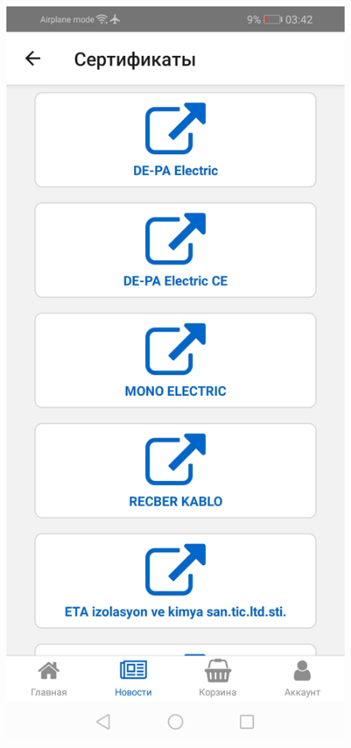 \begin{figure}[!p]
\begin{minipage}{0.19\textwidth}
        \includegraphics[width=.99\linewidth]
        {images/android/article-certificates.jpg}
    \end{minipage}
    \begin{minipage}{0.19\textwidth}
        \centering


\end{minipage}
\end{figure}
